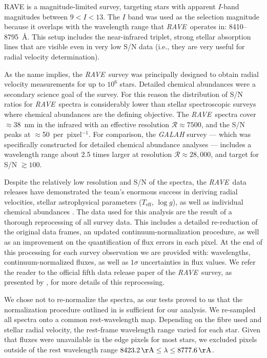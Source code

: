 \documentclass[preprint2,trackchanges]{aastex}
\newcommand{\project}[1]{\textsl{#1}}
\newcommand{\acronym}[1]{{\small{#1}}}
\newcommand{\rave}{\project{\acronym{RAVE}}}
\newcommand{\logg}{\log g}
\newcommand{\teff}{T_{\mathrm{eff}}}
\begin{document}
RAVE is a magnitude-limited survey, targeting stars with apparent $I$-band
magnitudes between $9 < I < 13$.  The $I$ band was used as the selection
magnitude because it overlaps with the wavelength range that \rave\ operates in:
8410--8795~\AA.  This setup includes the  near-infrared triplet,
strong stellar absorption lines that are visible even in very low S/N data 
(i.e., they are very useful for radial velocity determination).  


As the name implies, the \rave\ survey was principally designed to obtain radial
velocity measurements for up to $10^6$ stars.  Detailed chemical abundances were
a secondary science goal of the survey.  For this reason the distribution
of S/N ratios for \rave\ spectra is considerably lower than stellar 
spectroscopic surveys where chemical abundances are the defining objective.  The 
\rave\ spectra cover $\approx38$~nm in the infrared with an effective resolution
$\mathcal{R} \approx 7500$, and the S/N peaks at $\approx$50~per~pixel$^{-1}$.
For comparison, the \project{GALAH} survey \citep{DeSilva_2015} --- which was 
specifically constructed for detailed chemical abundance analyses --- includes a
wavelength range about 2.5 times larger at resolution $\mathcal{R} \approx 28,000$,
and target for S/N $\gtrsim100$.


Despite the relatively low resolution and S/N of the spectra, the \rave\ data
releases have demonstrated the team's enormous success in deriving radial 
velocities, stellar astrophysical parameters ($\teff$, $\logg$), as well as 
individual chemical abundances \citep{Steinmetz_2006,Zwitter_2008,Siebert_2011,
Kordopatis_2013, Kunder_2016}.  The data used for this analysis are the result
of a thorough reprocessing of all survey data.  This includes a detailed
re-reduction of the original data frames, an updated continuum-normalization
procedure, as well as an improvement on the quantification of flux errors in
each pixel.  At the end of this processing for each survey observation we are 
provided with: wavelengths, continuum-normalized fluxes, as well as 
$1\sigma$ uncertainties in flux values.  We refer the reader to the official 
fifth data release paper of the \rave\ survey, as presented by
\citet{Kunder_2016}, for more details of this reprocessing.


We chose not to re-normalize the spectra, as our tests proved to us that the
normalization procedure outlined in \citet{Kunder_2016} is sufficient for our
analysis.  We re-sampled all spectra onto a common rest-wavelength map.
Depending on the fibre used and stellar radial velocity, the rest-frame wavelength
range varied for each star.  Given that fluxes were unavailable in the edge
pixels for most stars, we excluded pixels outside of the rest wavelength range
$8423.2\,{\rm \AA} \le \lambda \le 8777.6\,{\rm \AA}$.
\end{document}
